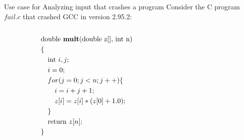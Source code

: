\begin{frame}{Use case for \ddp\: Analyzing input that crashes a program}
	Consider the C program $fail.c$ that crashed GCC in version 2.95.2:

	\begin{columns}
		\begin{column}{0.475\textwidth}
			\begin{align*}
	     &\text{double \textbf{mult}(double z[], int n)}\\
	     &\{\\
	     	&\quad \text{int } i,j; \\
	     	&\quad i = 0; \\
	     	&\quad for(j = 0; j < n; j++)\{ \\
	     	&\quad 	\quad i = i + j + 1; \\
	     &	\quad 	\quad z[i] = z[i] * (z[0] + 1.0); \\
	     &	\quad \} \\
	     &	\quad \text{return } z[n]; \\
	    & \}
	\end{align*} 
		\end{column}
		\begin{column}{0.475\textwidth}
			
		\end{column}
		
	\end{columns}

	
	
\end{frame}

